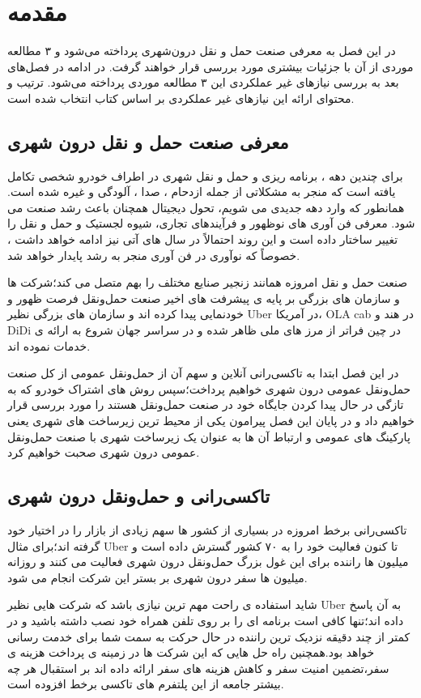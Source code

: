 \chapter{مقدمه}
در این فصل به معرفی صنعت حمل و نقل درون‌شهری پرداخته می‌شود و ۳ مطالعه موردی از آن با جزئیات بیشتری مورد بررسی قرار خواهند گرفت. در ادامه در فصل‌های بعد به بررسی نیازهای غیر عملکردی  این ۳ مطالعه موردی پرداخته می‌شود. ترتیب و محتوای ارائه این نیازهای غیر عملکردی بر اساس کتاب \cite{bass2003software} انتخاب شده است.

\section{معرفی صنعت حمل و نقل درون شهری}
برای چندین دهه ، برنامه ریزی و حمل و نقل شهری در اطراف خودرو شخصی تکامل یافته است که منجر به مشکلاتی از جمله ازدحام ، صدا ، آلودگی و غیره شده است. همانطور که وارد دهه جدیدی می شویم، تحول دیجیتال همچنان باعث رشد صنعت می شود. معرفی فن آوری های نوظهور و فرآیندهای تجاری، شیوه لجستیک و حمل و نقل را تغییر ساختار داده است و این روند احتمالاً در سال های آتی نیز ادامه خواهد داشت ، خصوصاً که نوآوری در فن آوری منجر به رشد پایدار خواهد شد.

صنعت حمل و نقل امروزه همانند زنجیر صنایع مختلف را بهم متصل می کند؛‌شرکت ها و سازمان های بزرگی بر پایه ی پیشرفت های اخیر صنعت حمل‌و‌نقل فرصت ظهور و خودنمایی پیدا کرده اند و سازمان های بزرگی نظیر Uber در آمریکا، OLA cab در هند و DiDi در چین فراتر از مرز های ملی ظاهر شده و در سراسر جهان شروع به ارائه ی خدمات نموده اند.

در این فصل ابتدا به تاکسی‌رانی آنلاین و سهم آن از حمل‌و‌نقل عمومی از کل صنعت حمل‌و‌نقل عمومی درون شهری خواهیم پرداخت؛سپس روش های اشتراک خودرو که به تازگی در حال پیدا کردن جایگاه خود در صنعت حمل‌و‌نقل هستند را مورد بررسی قرار خواهیم داد و در پایان این فصل پیرامون یکی از محیط ترین زیرساخت های شهری یعنی پارکینگ های عمومی و ارتباط آن ها به عنوان یک زیرساخت شهری با صنعت حمل‌و‌نقل عمومی درون شهری صحبت خواهیم کرد.
\section{تاکسی‌رانی و حمل‌و‌نقل درون شهری}
تاکسی‌رانی برخط  امروزه در بسیاری از کشور ها سهم زیادی از بازار را در اختیار خود گرفته اند؛برای مثال Uber تا کنون فعالیت خود را به ۷۰ کشور گسترش داده است و میلیون ها راننده برای این غول بزرگ حمل‌و‌نقل درون شهری فعالیت می کنند و روزانه میلیون ها سفر درون شهری بر بستر این شرکت انجام می شود.

شاید استفاده ی راحت مهم ترین نیازی باشد که شرکت هایی نظیر Uber به آن پاسخ داده اند؛تنها کافی است برنامه ای را بر روی تلفن همراه خود نصب داشته باشید و در کمتر از چند دقیقه نزدیک ترین راننده در حال حرکت به سمت شما برای خدمت رسانی خواهد بود.همچنین راه حل هایی که این شرکت ها در زمینه ی پرداخت هزینه ی سفر،‌تضمین امنیت سفر و کاهش هزینه های سفر ارائه داده اند بر استقبال هر چه بیشتر جامعه از این پلتفرم  های تاکسی برخط افزوده است.

